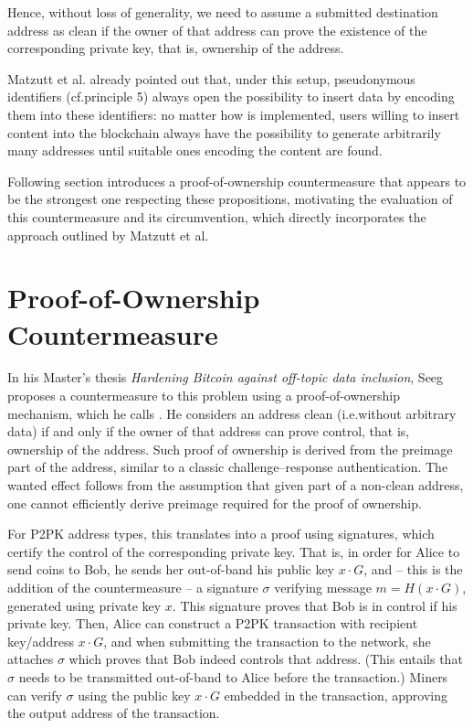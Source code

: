 \documentclass[a4paper,11pt,titlepage]{scrbook}
\begin{document}
Hence, without loss of generality, we need to assume a submitted destination address as clean if the owner of that address can prove the existence of the corresponding private key, that is, ownership of the address.

Matzutt et al.\@ \cite[Sec.~III.C]{matzutt_thwarting_2018} already pointed out that, under this setup, pseudonymous identifiers (cf.\@ principle 5) always open the possibility to insert data by encoding them into these identifiers: no matter how  is implemented, users willing to insert content into the blockchain always have the possibility to generate arbitrarily many addresses until suitable ones encoding the content are found.

Following section introduces a proof-of-ownership countermeasure that appears to be the strongest one respecting these propositions, motivating the evaluation of this countermeasure and its circumvention, which directly incorporates the approach outlined by Matzutt et al.


\section{Proof-of-Ownership Countermeasure}

In his Master's thesis \emph{Hardening Bitcoin against off-topic data inclusion}, Seeg proposes a countermeasure to this problem using a proof-of-ownership mechanism, which he calls  \cite{seeg_hardening_2018}.
He considers an address clean (i.e.\@ without arbitrary data) if and only if the owner of that address can prove control, that is, ownership of the address.
Such proof of ownership is derived from the  preimage part of the address, similar to a classic challenge–response authentication.
The wanted effect follows from the assumption that given  part of a non-clean address, one cannot efficiently derive  preimage required for the proof of ownership.

For P2PK address types, this translates into a proof using signatures, which certify the control of the corresponding private key.
That is, in order for Alice to send coins to Bob, he sends her out-of-band his public key $x\cdot G$, and – this is the addition of the countermeasure – a signature $\sigma$ verifying message $m=H(x\cdot G)$, generated using private key $x$.
This signature proves that Bob is in control if his private key.
Then, Alice can construct a P2PK transaction with recipient key/address $x\cdot G$, and when submitting the transaction to the network, she attaches $\sigma$ which proves that Bob indeed controls that address. 
(This entails that $\sigma$ needs to be transmitted out-of-band to Alice before the transaction.)
Miners can verify $\sigma$ using the public key $x\cdot G$ embedded in the transaction, approving the output address of the transaction.
\end{document}
